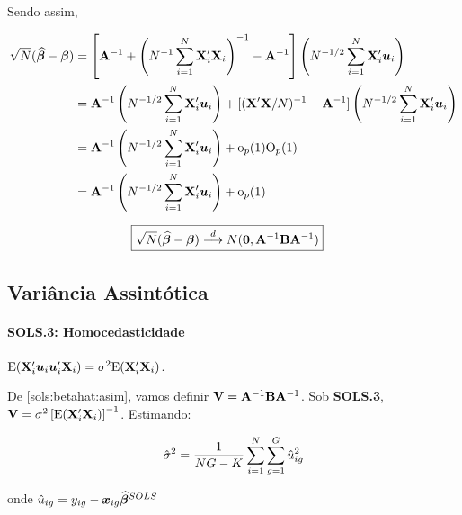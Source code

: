 \documentclass[11pt, oneside, a4paper, article]{article}
\numberwithin{equation}{section}
\begin{document}
\noindent
Sendo assim,

\vspace{-1 em}
\begin{align*} 
\sqrt{N}(\widehat{\boldsymbol{\beta}} - \boldsymbol{\beta}) &= 
\left[ 
\mathbf{A}^{-1} +
\left( N^{-1} \sum_{i=1}^{N} \mathbf{X}_{i}' \mathbf{X}_{i}   \right)^{-1}
- \mathbf{A}^{-1}
\right]
\left( N^{-1/2} \sum_{i=1}^{N} \mathbf{X}_{i}' \boldsymbol{u}_{i}   \right)
\\ &=
\mathbf{A}^{-1}\left( N^{-1/2} \sum_{i=1}^{N} \mathbf{X}_{i}' \boldsymbol{u}_{i}   \right)
+
[(\mathbf{X}'\mathbf{X}/N)^{-1} - \mathbf{A}^{-1}]
\left( N^{-1/2} \sum_{i=1}^{N} \mathbf{X}_{i}' \boldsymbol{u}_{i}   \right)
\\&=
\mathbf{A}^{-1}\left( N^{-1/2} \sum_{i=1}^{N} \mathbf{X}_{i}' \boldsymbol{u}_{i}   \right)
+ \text{o}_{p}(1) \text{O}_{p}(1)
\\&=
\mathbf{A}^{-1}\left( N^{-1/2} \sum_{i=1}^{N} \mathbf{X}_{i}' \boldsymbol{u}_{i}   \right)
+ \text{o}_{p}(1)
\end{align*}

\vspace{-1 em}
\begin{align}\label{sols:betahat:asim}
\Aboxed{
\sqrt{N}(\betahatbold - \betavec)
\arrowd
N(\zerovec, \Amat^{-1} \Bmat \Amat^{-1})
}
\end{align}

\subsection{Variância Assintótica}

\paragraph{SOLS.3: Homocedasticidade}
$\text{E}(\mathbf{X}_{i}' \boldsymbol{u}_{i} \boldsymbol{u}_{i}' \mathbf{X}_{i}) = \sigma^{2} \text{E}(\mathbf{X}_{i}' \mathbf{X}_{i})$.

\vspace{1 em} 
De \eqref{sols:betahat:asim}, vamos definir $\mathbf{V} = \mathbf{A}^{-1} \mathbf{B} \mathbf{A}^{-1}$.
Sob \textbf{SOLS.3},
$\mathbf{V} = \sigma^{2} \left[ \text{E}(\mathbf{X}_{i}' \mathbf{X}_{i}) \right]^{-1}$.
Estimando:

\vspace{-1 em}
\begin{align*}
\hat{\sigma}^{2}
=
\frac{1}{NG - K}
\sum_{i =1}^{N} \sum_{g=1}^{G} \hat{u}^2_{ig}
\end{align*}

\noindent onde $\hat{u}_{ig} = y_{ig} - \boldsymbol{x}_{ig} \widehat{\boldsymbol{\beta}}^{SOLS}$
\end{document}
